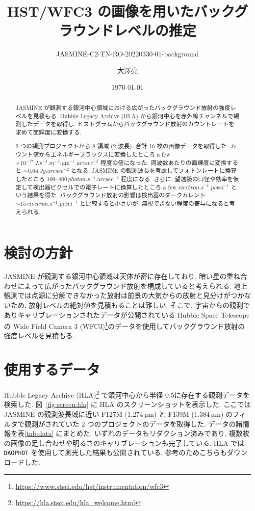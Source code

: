 \documentclass[10pt,a4paper,dvipdfmx,uplatex]{jsarticle}
\title{HST/WFC3 の画像を用いたバックグラウンドレベルの推定}
\subtitle{JASMINE-C2-TN-RO-20220330-01-background}
\author{大澤亮}
\date{\today}
\begin{document}
\maketitle

\begin{abstract}
  JASMINE が観測する銀河中心領域における広がったバックグラウンド放射の強度レベルを見積もる. Hubble Legacy Archive (HLA) から銀河中心を赤外線チャンネルで観測したデータを取得し, ヒストグラムからバックグラウンド放射のカウントレートを求めて面輝度に変換する.

  2 つの観測プロジェクトから 8 領域 (2 波長), 合計 16 枚の画像データを取得した. カウント値からエネルギーフラックスに変換したところ a few ${\times}10^{-17}\,\unit{J.s^{-1}.m^{-2}.\micro\meter^{-1}.arcsec^{-2}}$ 程度の値になった. 周波数あたりの面輝度に変換すると ${\sim}\SI{0.04}{Jy.arcsec^{-2}}$ となる. JASMINE の観測波長を考慮してフォトンレートに換算したところ $\numrange{100}{400}\,\unit{photon.s^{-1}.arcsec^{-2}}$ 程度になる. さらに, 望遠鏡の口径や効率を仮定して検出器ピクセルでの電子レートに換算したところ a few $\unit{electron.s^{-1}.pixel^{-1}}$ という結果を得た. バックグラウンド放射の影響は検出器のダークカレント ${\sim}\SI{15}{electron.s^{-1}.pixel^{-1}}$ と比較すると小さいが, 無視できない程度の寄与になると考えられる.
\end{abstract}

\section{検討の方針}
JASMINE が観測する銀河中心領域は天体が密に存在しており, 暗い星の重ね合わせによって広がったバックグラウンド放射を構成していると考えられる. 地上観測では点源に分解できなかった放射は前景の大気からの放射と見分けがつかないため, 放射レベルの絶対値を見積もることは難しい. そこで, 宇宙からの観測でありキャリブレーションされたデータが公開されている Hubble Space Telescope の Wide Field Camera 3 (WFC3)\footnote{\url{https://www.stsci.edu/hst/instrumentation/wfc3}}のデータを使用してバックグラウンド放射の強度レベルを見積もる.


\section{使用するデータ}
Hubble Legacy Archive (HLA)\footnote{\url{https://hla.stsci.edu/hla_welcome.html}} で銀河中心から半径 0.5\deg に存在する観測データを検索した. 図~\ref{fig:screen:hla} に HLA のスクリーンショットを表示した. ここでは JASMINE の観測波長域に近い F127M ($\SI{1.274}{\micro\meter}$) と F139M ($\SI{1.384}{\micro\meter}$) のフィルタで観測がされていた 2 つのプロジェクトのデータを取得した. データの諸情報を表\ref{tab:data} にまとめた. いずれのデータもリダクション済みであり, 複数枚の画像の足し合わせや明るさのキャリブレーションも完了している. HLA では \texttt{DAOPHOT} を使用して測光した結果も公開されている. 参考のためこちらもダウンロードした.
\end{document}
